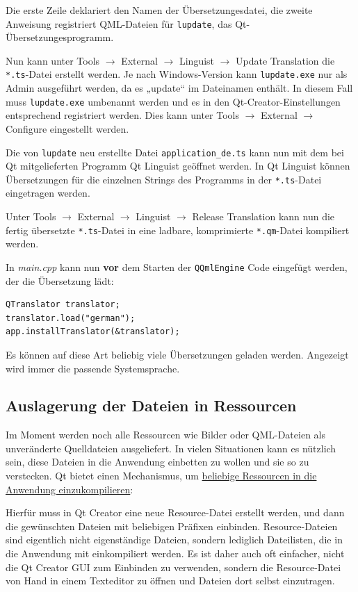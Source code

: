 \documentclass[a4paper]{article}
\begin{document}
Die erste Zeile deklariert den Namen der Übersetzungesdatei, die zweite Anweisung registriert QML-Dateien für \verb~lupdate~, das Qt-Übersetzungesprogramm.

Nun kann unter Tools $\rightarrow$ External $\rightarrow$ Linguist $\rightarrow$ Update Translation die \verb~*.ts~-Datei erstellt werden. Je nach Windows-Version kann \verb~lupdate.exe~ nur als Admin ausgeführt werden, da es „update“ im Dateinamen enthält. In diesem Fall muss \verb~lupdate.exe~ umbenannt werden und es in den Qt-Creator-Einstellungen entsprechend registriert werden. Dies kann unter Tools $\rightarrow$ External $\rightarrow$ Configure eingestellt werden.

Die von \verb~lupdate~ neu erstellte Datei \verb~application_de.ts~ kann nun mit dem bei Qt mitgelieferten Programm Qt Linguist geöffnet werden. In Qt Linguist können Übersetzungen für die einzelnen Strings des Programms in der \verb~*.ts~-Datei eingetragen werden.

Unter Tools $\rightarrow$ External $\rightarrow$ Linguist $\rightarrow$ Release Translation kann nun die fertig übersetzte \verb~*.ts~-Datei in eine ladbare, komprimierte \verb~*.qm~-Datei kompiliert werden.

In \emph{main.cpp} kann nun \textbf{vor} dem Starten der \verb~QQmlEngine~ Code eingefügt werden, der die Übersetzung lädt:
\begin{verbatim}
QTranslator translator;
translator.load("german");
app.installTranslator(&translator);
\end{verbatim}

Es können auf diese Art beliebig viele Übersetzungen geladen werden. Angezeigt wird immer die passende Systemsprache.
\subsection{Auslagerung der Dateien in Ressourcen}
\label{sec-2-6}
Im Moment werden noch alle Ressourcen wie Bilder oder QML-Dateien als unveränderte Quelldateien ausgeliefert. In vielen Situationen kann es nützlich sein, diese Dateien in die Anwendung einbetten zu wollen und sie so zu verstecken. Qt bietet einen Mechanismus, um \href{http://qt-project.org/doc/qt-5.0/qtcore/resources.html}{beliebige Ressourcen in die Anwendung einzukompilieren}:

Hierfür muss in Qt Creator eine neue Resource-Datei erstellt werden, und dann die gewünschten Dateien mit beliebigen Präfixen einbinden. Resource-Dateien sind eigentlich nicht eigenständige Dateien, sondern lediglich Dateilisten, die in die Anwendung mit einkompiliert werden. Es ist daher auch oft einfacher, nicht die Qt Creator GUI zum Einbinden zu verwenden, sondern die Resource-Datei von Hand in einem Texteditor zu öffnen und Dateien dort selbst einzutragen.
\end{document}
